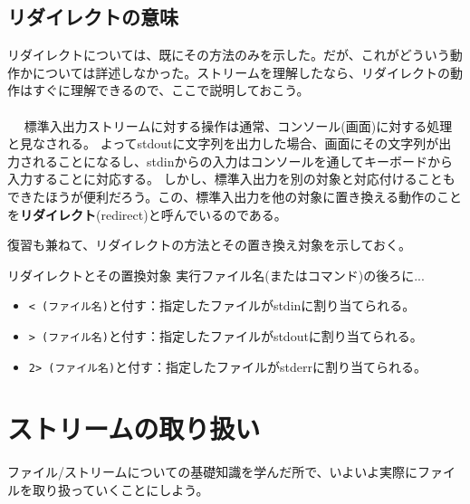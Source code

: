 \subsection{リダイレクトの意味}
リダイレクトについては、既にその方法のみを示した。だが、これがどういう動作かについては詳述しなかった。ストリームを理解したなら、リダイレクトの動作はすぐに理解できるので、ここで説明しておこう。
\\ \\　
標準入出力ストリームに対する操作は通常、コンソール(画面)に対する処理と見なされる。
よってstdoutに文字列を出力した場合、画面にその文字列が出力されることになるし、stdinからの入力はコンソールを通してキーボードから入力することに対応する。
しかし、標準入出力を別の対象と対応付けることもできたほうが便利だろう。この、標準入出力を他の対象に置き換える動作のことを\textbf{リダイレクト}(redirect)と呼んでいるのである。

復習も兼ねて、リダイレクトの方法とその置き換え対象を示しておく。
\begin{itembox}[l]{リダイレクトとその置換対象}
実行ファイル名(またはコマンド)の後ろに...
\begin{itemize}
\item \verb|< (ファイル名)|と付す：指定したファイルがstdinに割り当てられる。
\item \verb|> (ファイル名)|と付す：指定したファイルがstdoutに割り当てられる。
\item \verb|2> (ファイル名)|と付す：指定したファイルがstderrに割り当てられる。
\end{itemize}
\end{itembox}

\section{ストリームの取り扱い}
ファイル/ストリームについての基礎知識を学んだ所で、いよいよ実際にファイルを取り扱っていくことにしよう。
